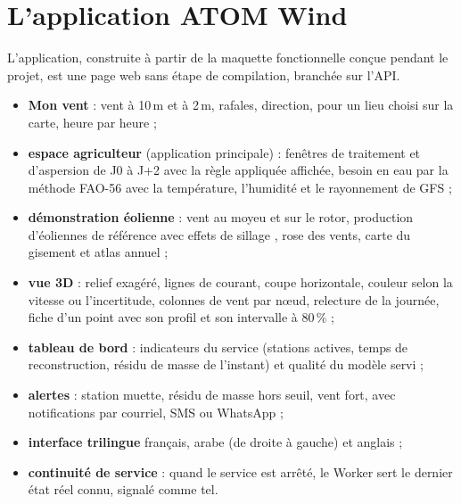\section{L'application ATOM Wind}
L'application, construite à partir de la maquette fonctionnelle conçue pendant le projet, est une
page web sans étape de compilation, branchée sur l'API.

\begin{itemize}
  \item \textbf{Mon vent} : vent à 10\,m et à 2\,m, rafales, direction, pour un lieu choisi sur la
        carte, heure par heure ;
  \item \textbf{espace agriculteur} (application principale) : fenêtres de traitement et
        d'aspersion de J0 à J+2 avec la règle appliquée affichée, besoin en eau par la méthode
        FAO-56 \citep{allen1998} avec la température, l'humidité et le rayonnement de GFS ;
  \item \textbf{démonstration éolienne} : vent au moyeu et sur le rotor, production d'éoliennes de
        référence avec effets de sillage \citep{jensen1983}, rose des vents, carte du gisement et
        atlas annuel ;
  \item \textbf{vue 3D} : relief exagéré, lignes de courant, coupe horizontale, couleur selon la
        vitesse ou l'incertitude, colonnes de vent par nœud, relecture de la journée, fiche d'un
        point avec son profil et son intervalle à 80\,\% ;
  \item \textbf{tableau de bord} : indicateurs du service (stations actives, temps de
        reconstruction, résidu de masse de l'instant) et qualité du modèle servi ;
  \item \textbf{alertes} : station muette, résidu de masse hors seuil, vent fort, avec
        notifications par courriel, SMS ou WhatsApp ;
  \item \textbf{interface trilingue} français, arabe (de droite à gauche) et anglais ;
  \item \textbf{continuité de service} : quand le service est arrêté, le Worker sert le dernier
        état réel connu, signalé comme tel.
\end{itemize}


